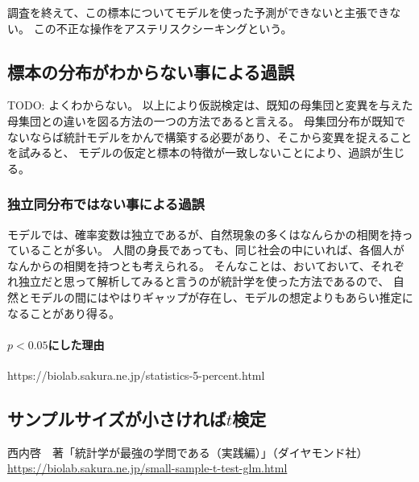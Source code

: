 調査を終えて、この標本についてモデルを使った予測ができないと主張できない。
この不正な操作をアステリスクシーキングという。

\subsection{標本の分布がわからない事による過誤}
TODO: よくわからない。
以上により仮説検定は、既知の母集団と変異を与えた母集団との違いを図る方法の一つの方法であると言える。
母集団分布が既知でないならば統計モデルをかんで構築する必要があり、そこから変異を捉えることを試みると、
モデルの仮定と標本の特徴が一致しないことにより、過誤が生じる。

\subsubsection{独立同分布ではない事による過誤}
モデルでは、確率変数は独立であるが、自然現象の多くはなんらかの相関を持っていることが多い。
人間の身長であっても、同じ社会の中にいれば、各個人がなんからの相関を持つとも考えられる。
そんなことは、おいておいて、それぞれ独立だと思って解析してみると言うのが統計学を使った方法であるので、
自然とモデルの間にはやはりギャップが存在し、モデルの想定よりもあらい推定になることがあり得る。
\fi
{}
\paragraph{$p<0.05$にした理由}
https://biolab.sakura.ne.jp/statistics-5-percent.html
\fi



\subsection{サンプルサイズが小さければ$t$検定}
西内啓　著「統計学が最強の学問である（実践編）」（ダイヤモンド社）
\url{https://biolab.sakura.ne.jp/small-sample-t-test-glm.html}
\fi 
